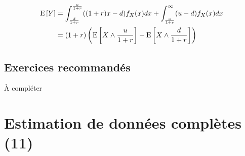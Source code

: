 \documentclass[12pt, french]{report}
\begin{document}

\begin{align*}
\mathrm{E} \left[ Y \right]	& = \int_{\frac{d}{1+r}}^{\frac{u}{1+r}} ((1+r) x - d) f_X(x) dx + \int_{\frac{u}{1+r}}^{\infty} (u-d) f_X(x) dx \\
	& = (1+r) \left( \mathrm{E} \left[ X \wedge \frac{u}{1+r} \right] - \mathrm{E} \left[ X \wedge \frac{d}{1+r} \right]   \right) \\
\end{align*}

\section{Exercices recommandés}
À compléter





\chapter{Estimation de données complètes (11)}
\label{chap:estimation_Fn}
\setcounter{section}{1}
\end{document}
